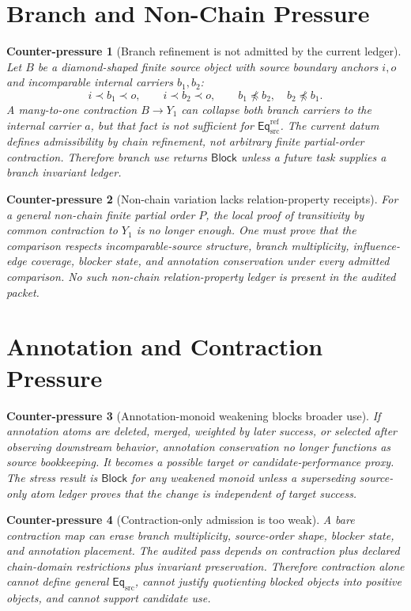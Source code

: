 \documentclass[11pt]{article}
\newcommand{\EqSrc}{\mathsf{Eq}_{\mathrm{src}}}
\newcommand{\EqRef}{\mathsf{Eq}_{\mathrm{src}}^{\mathrm{ref}}}
\newcommand{\Block}{\mathsf{Block}}
\newtheorem{counterpressure}{Counter-pressure}
\begin{document}
\section{Branch and Non-Chain Pressure}

\begin{counterpressure}[Branch refinement is not admitted by the current ledger]
Let \(B\) be a diamond-shaped finite source object with source boundary
anchors \(i,o\) and incomparable internal carriers \(b_{1},b_{2}\):
\[
    i\prec b_{1}\prec o,\qquad i\prec b_{2}\prec o,\qquad
    b_{1}\npreceq b_{2},\quad b_{2}\npreceq b_{1}.
\]
A many-to-one contraction \(B\to Y_{1}\) can collapse both branch
carriers to the internal carrier \(a\), but that fact is not sufficient
for \(\EqRef\). The current datum defines admissibility by chain
refinement, not arbitrary finite partial-order contraction. Therefore
branch use returns \(\Block\) unless a future task supplies a branch
invariant ledger.
\end{counterpressure}

\begin{counterpressure}[Non-chain variation lacks relation-property receipts]
For a general non-chain finite partial order \(P\), the local proof of
transitivity by common contraction to \(Y_{1}\) is no longer enough. One
must prove that the comparison respects incomparable-source structure,
branch multiplicity, influence-edge coverage, blocker state, and
annotation conservation under every admitted comparison. No such
non-chain relation-property ledger is present in the audited packet.
\end{counterpressure}

\section{Annotation and Contraction Pressure}

\begin{counterpressure}[Annotation-monoid weakening blocks broader use]
If annotation atoms are deleted, merged, weighted by later success, or
selected after observing downstream behavior, annotation conservation no
longer functions as source bookkeeping. It becomes a possible target or
candidate-performance proxy. The stress result is \(\Block\) for any
weakened monoid unless a superseding source-only atom ledger proves that
the change is independent of target success.
\end{counterpressure}

\begin{counterpressure}[Contraction-only admission is too weak]
A bare contraction map can erase branch multiplicity, source-order
shape, blocker state, and annotation placement. The audited pass depends
on contraction plus declared chain-domain restrictions plus invariant
preservation. Therefore contraction alone cannot define general
\(\EqSrc\), cannot justify quotienting blocked objects into positive
objects, and cannot support candidate use.
\end{counterpressure}
\end{document}
